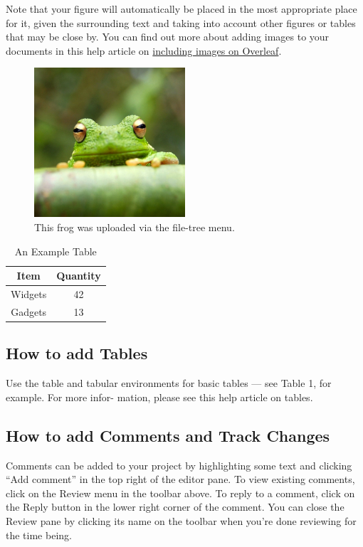 \documentclass[10pt,english]{article}
\begin{document}
	Note that your figure will automatically be placed in the most appropriate place for it, given the
	surrounding text and taking into account other figures or  tables that may be close by. You can find
	out more about adding images to your documents in this  help article on \href{http://www.overleaf.com/learn/how.to/Including_images_on_Overleaf}{including images on Overleaf}.
	\begin{figure}[h!tbp]
		\centering
		\includegraphics[width=0.5\textwidth]{frog.png}
		\caption{ This frog was uploaded via the file-tree menu.}
	\end{figure}

	\begin{table}[h]
		\centering
		\begin{tabular}{c|c}
			
			{Item} & {Quantity}\\
			\hline
			Widgets&42\\
			
			Gadgets&13\\
			
		\end{tabular}
		\caption{An Example Table}
		\label{tab:example}
	\end{table}
	
	\subsection{How to add Tables}
	Use the table and tabular environments for basic tables — see Table 1, for example. For more infor-
	mation, please see this help article on tables.
	\subsection{How to add Comments and Track Changes}
	Comments can be added to your project by highlighting some text and clicking “Add comment” in
	the top right of the editor pane. To view existing comments, click on the Review menu in the toolbar
	above. To reply to a comment, click on the Reply button in the lower right corner of the comment.
	You can close the Review pane by clicking its name on the toolbar when you’re done reviewing for the
	time being.
	
\end{document}
